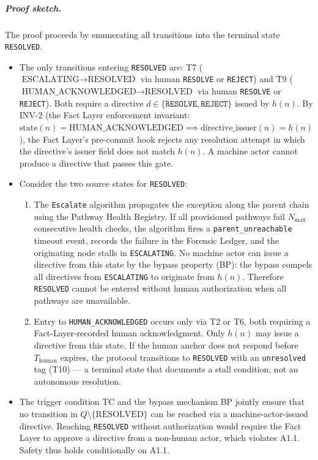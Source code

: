 \subparagraph{Proof sketch.} The proof proceeds by enumerating all transitions into the terminal state \texttt{RESOLVED}.

\begin{itemize}
\item[\textbf{Step 1.}] The only transitions entering \texttt{RESOLVED} are: T7 ($\text{ESCALATING} \rightarrow \text{RESOLVED}$ via human \texttt{RESOLVE} or \texttt{REJECT}) and T9 ($\text{HUMAN\_ACKNOWLEDGED} \rightarrow \text{RESOLVED}$ via human \texttt{RESOLVE} or \texttt{REJECT}). Both require a directive $d \in \{\texttt{RESOLVE}, \texttt{REJECT}\}$ issued by $h(n)$. By INV-2 (the Fact Layer enforcement invariant: $\text{state}(n) = \text{HUMAN\_ACKNOWLEDGED} \implies \text{directive\_issuer}(n) = h(n)$), the Fact Layer's pre-commit hook rejects any resolution attempt in which the directive's issuer field does not match $h(n)$. A machine actor cannot produce a directive that passes this gate.

\item[\textbf{Step 2.}] Consider the two source states for \texttt{RESOLVED}:
\begin{enumerate}
\item[\textbf{From ESCALATING:}] The \texttt{Escalate} algorithm propagates the exception along the parent chain using the Pathway Health Registry. If all provisioned pathways fail $N_{\max}$ consecutive health checks, the algorithm fires a \texttt{parent\_unreachable} timeout event, records the failure in the Forensic Ledger, and the originating node stalls in \texttt{ESCALATING}. No machine actor can issue a directive from this state by the bypass property (BP): the bypass compels all directives from \texttt{ESCALATING} to originate from $h(n)$. Therefore \texttt{RESOLVED} cannot be entered without human authorization when all pathways are unavailable.

\item[\textbf{From HUMAN\_ACKNOWLEDGED:}] Entry to \texttt{HUMAN\_ACKNOWLEDGED} occurs only via T2 or T6, both requiring a Fact-Layer-recorded human acknowledgment. Only $h(n)$ may issue a directive from this state. If the human anchor does not respond before $T_{\text{human}}$ expires, the protocol transitions to \texttt{RESOLVED} with an \texttt{unresolved} tag (T10) — a terminal state that documents a stall condition, not an autonomous resolution.
\end{enumerate}

\item[\textbf{Step 3.}] The trigger condition TC and the bypass mechanism BP jointly ensure that no transition in $Q \setminus \{\text{RESOLVED}\}$ can be reached via a machine-actor-issued directive. Reaching \texttt{RESOLVED} without authorization would require the Fact Layer to approve a directive from a non-human actor, which violates A1.1. Safety thus holds conditionally on A1.1.
\end{itemize}

